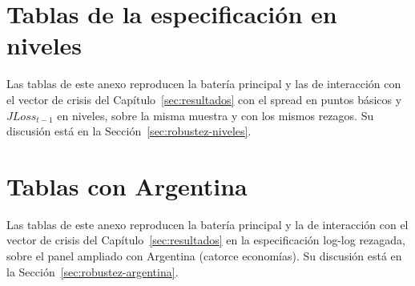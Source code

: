 \chapter{Tablas de la especificación en niveles}
\label{sec:anexo-niveles}

Las tablas de este anexo reproducen la batería principal y las de interacción con el vector de crisis del Capítulo~\ref{sec:resultados} con el spread en puntos básicos y $JLoss_{t-1}$ en niveles, sobre la misma muestra y con los mismos rezagos. Su discusión está en la Sección~\ref{sec:robustez-niveles}.





\chapter{Tablas con Argentina}
\label{sec:anexo-argentina}

Las tablas de este anexo reproducen la batería principal y la de interacción con el vector de crisis del Capítulo~\ref{sec:resultados} en la especificación log-log rezagada, sobre el panel ampliado con Argentina (catorce economías). Su discusión está en la Sección~\ref{sec:robustez-argentina}.




